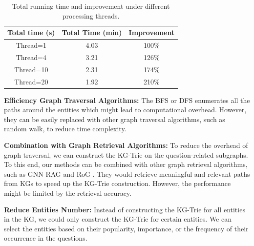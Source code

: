 {    \begin{table}[h!]
        \centering
        \caption{Total running time and improvement under different processing threads.}
        \label{tab:multi-processing}
        \begin{tabular}{@{}ccc@{}}
            \toprule
            Total time (s) & Total Time (min) & Improvement \\ \midrule
            Thread=1       & 4.03             & 100\%       \\
            Thread=4       & 3.21             & 126\%       \\
            Thread=10      & 2.31             & 174\%       \\
            Thread=20      & 1.92             & 210\%       \\ \bottomrule
        \end{tabular}%
    \end{table}

    \noindent\textbf{Efficiency Graph Traversal Algorithms:} The BFS or DFS enumerates all the paths around the entities which might lead to computational overhead. However, they can be easily replaced with other graph traversal algorithms, such as random walk, to reduce time complexity.


    \noindent\textbf{Combination with Graph Retrieval Algorithms:} To reduce the overhead of graph traversal, we can construct the KG-Trie on the question-related subgraphs. To this end, our methods can be combined with other graph retrieval algorithms, such as GNN-RAG \citep{mavromatis2024gnn} and RoG \citep{luo2024rog}. They would retrieve meaningful and relevant paths from KGs to speed up the KG-Trie construction. However, the performance might be limited by the retrieval accuracy.

    \noindent\textbf{Reduce Entities Number:} Instead of constructing the KG-Trie for all entities in the KG, we could only construct the KG-Trie for certain entities. We can select the entities based on their popularity, importance, or the frequency of their occurrence in the questions.

}
